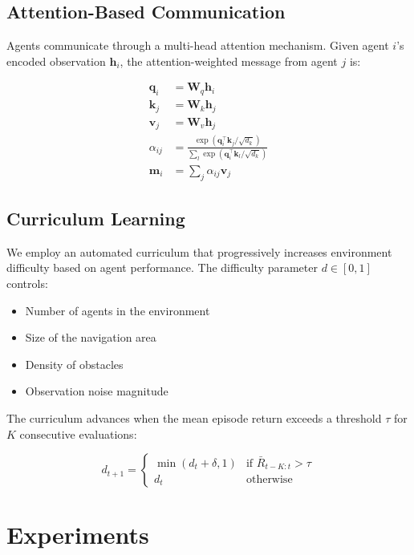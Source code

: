 \documentclass[12pt,a4paper]{report}
\begin{document}
\section{Attention-Based Communication}
Agents communicate through a multi-head attention mechanism. Given agent $i$'s encoded observation
$\mathbf{h}_i$, the attention-weighted message from agent $j$ is:

\begin{align}
\mathbf{q}_i &= \mathbf{W}_q \mathbf{h}_i \\
\mathbf{k}_j &= \mathbf{W}_k \mathbf{h}_j \\
\mathbf{v}_j &= \mathbf{W}_v \mathbf{h}_j \\
\alpha_{ij} &= \frac{\exp(\mathbf{q}_i^\top \mathbf{k}_j / \sqrt{d_k})}
                    {\sum_{l} \exp(\mathbf{q}_i^\top \mathbf{k}_l / \sqrt{d_k})} \\
\mathbf{m}_i &= \sum_j \alpha_{ij} \mathbf{v}_j
\label{eq:attention}
\end{align}

\section{Curriculum Learning}
We employ an automated curriculum that progressively increases environment difficulty based on agent
performance. The difficulty parameter $d \in [0, 1]$ controls:
\begin{itemize}
    \item Number of agents in the environment
    \item Size of the navigation area
    \item Density of obstacles
    \item Observation noise magnitude
\end{itemize}

The curriculum advances when the mean episode return exceeds a threshold $\tau$ for $K$ consecutive
evaluations:

\begin{equation}
d_{t+1} = \begin{cases}
    \min(d_t + \delta, 1) & \text{if } \bar{R}_{t-K:t} > \tau \\
    d_t & \text{otherwise}
\end{cases}
\label{eq:curriculum}
\end{equation}

\chapter{Experiments}
\label{ch:experiments}
\end{document}
